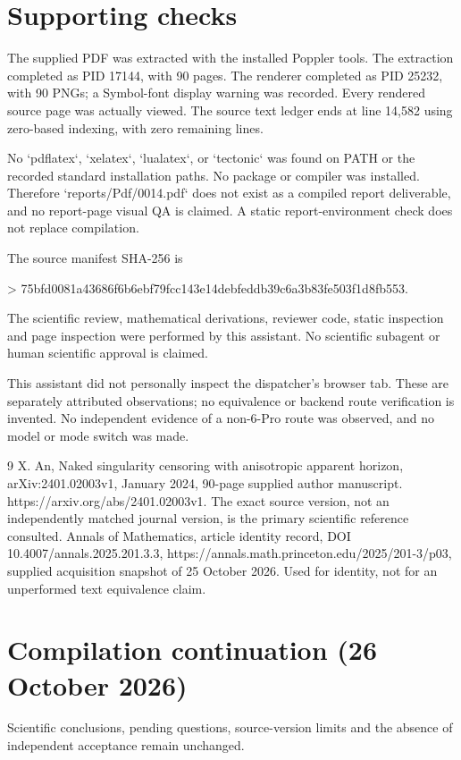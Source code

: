 \documentclass[10pt]{article}
\begin{document}
\section*{Supporting checks}
The supplied PDF was extracted with the installed Poppler tools. The extraction completed as PID 17144, with 90 pages. The renderer completed as PID 25232, with 90 PNGs; a Symbol-font display warning was recorded. Every rendered source page was actually viewed. The source text ledger ends at line 14,582 using zero-based indexing, with zero remaining lines.\par
No `pdflatex`, `xelatex`, `lualatex`, or `tectonic` was found on PATH or the recorded standard installation paths. No package or compiler was installed. Therefore `reports/Pdf/0014.pdf` does not exist as a compiled report deliverable, and no report-page visual QA is claimed. A static report-environment check does not replace compilation.\par
The source manifest SHA-256 is\par
> 75bfd0081a43686f6b6ebf79fcc143e14debfeddb39c6a3b83fe503f1d8fb553.\par
The scientific review, mathematical derivations, reviewer code, static inspection and page inspection were performed by this assistant. No scientific subagent or human scientific approval is claimed.\par
This assistant did not personally inspect the dispatcher’s browser tab. These are separately attributed observations; no equivalence or backend route verification is invented. No independent evidence of a non-6-Pro route was observed, and no model or mode switch was made.\par
9 X. An, Naked singularity censoring with anisotropic apparent horizon, arXiv:2401.02003v1, January 2024, 90-page supplied author manuscript. https://arxiv.org/abs/2401.02003v1. The exact source version, not an independently matched journal version, is the primary scientific reference consulted. Annals of Mathematics, article identity record, DOI 10.4007/annals.2025.201.3.3, https://annals.math.princeton.edu/2025/201-3/p03, supplied acquisition snapshot of 25 October 2026. Used for identity, not for an unperformed text equivalence claim.\par
\section*{Compilation continuation (26 October 2026)}
Scientific conclusions, pending questions, source-version limits and the absence of independent acceptance remain unchanged.\par
\end{document}
